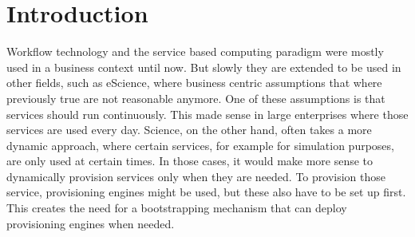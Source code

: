 \chapter{Introduction}

Workflow technology and the service based computing paradigm were mostly used in a business context until now.
But slowly they are extended to be used in other fields, such as eScience, where business centric assumptions that where previously true are not reasonable anymore.
One of these assumptions is that services should run continuously.
This made sense in large enterprises where those services are used every day.
Science, on the other hand, often takes a more dynamic approach, where certain services, for example for simulation purposes, are only used at certain times.
In those cases, it would make more sense to dynamically provision services only when they are needed.
To provision those service, provisioning engines might be used, but these also have to be set up first.
This creates the need for a bootstrapping mechanism that can deploy provisioning engines when needed.



